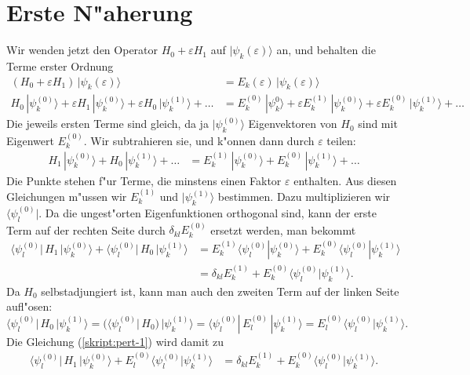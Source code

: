 \section{Erste N"aherung\label{section:erstenaeherung}}
Wir wenden jetzt den Operator $H_0+\varepsilon H_1$ auf
$|\psi_k(\varepsilon)\rangle$ an, und behalten die Terme erster Ordnung
\begin{align*}
(H_0+\varepsilon H_1)\,|\psi_k(\varepsilon)\rangle
&=
E_k(\varepsilon)\,|\psi_k(\varepsilon)\rangle
\\
H_0\,|\psi_k^{(0)}\rangle +\varepsilon H_1\,|\psi_k^{(0)}\rangle
+\varepsilon H_0\,|\psi_k^{(1)}\rangle
+\dots
&=
E_k^{(0)}\,|\psi_k^{0}\rangle + \varepsilon E_k^{(1)} \,|\psi_k^{(0)}\rangle
+ \varepsilon E_k^{(0)} \,|\psi_k^{(1)}\rangle + \dots
\end{align*}
Die jeweils ersten Terme sind gleich, da ja $|\psi_k^{(0)}\rangle$
Eigenvektoren von $H_0$ sind mit Eigenwert $E_k^{(0)}$. Wir subtrahieren sie,
und k"onnen dann durch $\varepsilon$ teilen:
\begin{align*}
H_1\,|\psi_k^{(0)}\rangle
+H_0\,|\psi_k^{(1)}\rangle
+ \dots
&=
E_k^{(1)}\,|\psi_k^{(0)}\rangle + E_k^{(0)} \,|\psi_k^{(1)}\rangle+\dots
\end{align*}
Die Punkte stehen f"ur Terme, die minstens einen Faktor $\varepsilon$
enthalten.
Aus diesen Gleichungen m"ussen wir $E_k^{(1)}$ und $|\psi_k^{(1)}\rangle$
bestimmen. Dazu multiplizieren wir $\langle \psi_l^{(0)}|$.
Da die ungest"orten Eigenfunktionen orthogonal sind, kann der erste
Term auf der rechten Seite durch $\delta_{kl}E_k^{(0)}$ ersetzt werden,
man bekommt
\begin{equation}
\begin{aligned}
\langle \psi_l^{(0)}|\, H_1 \,|\psi_k^{(0)}\rangle
+
\langle \psi_l^{(0)}|\, H_0 \,|\psi_k^{(1)}\rangle
&=
E_k^{(1)}\langle\psi_l^{(0)}|\psi_k^{(0)}\rangle
+
E_k^{(0)}\langle\psi_l^{(0)}|\psi_k^{(1)}\rangle
\\
&=
\delta_{kl} E_k^{(1)}
+
E_k^{(0)}\langle\psi_l^{(0)}|\psi_k^{(1)}\rangle.
\end{aligned}
\label{skript:pert-1}
\end{equation}
Da $H_0$ selbstadjungiert ist, kann man auch den zweiten Term auf der
linken Seite aufl"osen:
\[
\langle\psi_l^{(0)}|\,H_0\,|\psi_k^{(1)}\rangle
=
(\langle\psi_l^{(0)}|\,H_0)\,|\psi_k^{(1)}\rangle
=
\langle\psi_l^{(0)}|\,E_l^{(0)}\,|\psi_k^{(1)}\rangle
=
E_l^{(0)}\langle \psi_l^{(0)}|\psi_k^{(1)}\rangle.
\]
Die Gleichung (\ref{skript:pert-1}) wird damit zu
\begin{align*}
\langle \psi_l^{(0)}|\, H_1 \,|\psi_k^{(0)}\rangle
+
E_l^{(0)}\langle \psi_l^{(0)}|\psi_k^{(1)}\rangle
&=
\delta_{kl} E_k^{(1)}
+
E_k^{(0)}\langle\psi_l^{(0)}|\psi_k^{(1)}\rangle.
\end{align*}
